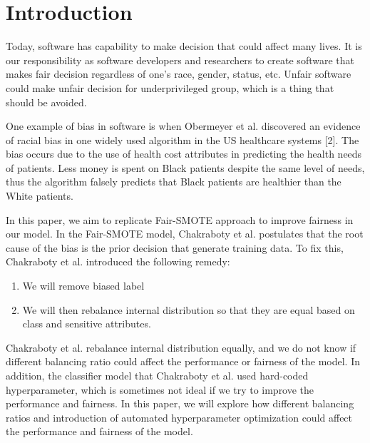 \documentclass[sigconf]{acmart}
\begin{document}

\maketitle

\section{Introduction}
Today, software has capability to make decision that could affect many lives. It is our responsibility as software developers and researchers to create software that makes fair decision regardless of one's race, gender, status, etc. Unfair software could make unfair decision for underprivileged group, which is a thing that should be avoided. 

One example of bias in software is when Obermeyer et al. discovered an evidence of racial bias in one widely used algorithm in the US healthcare systems [2]. The bias occurs due to the use of health cost attributes in predicting the health needs of patients. Less money is spent on Black patients despite the same level of needs, thus the algorithm falsely predicts that Black patients are healthier than the White patients.   

In this paper, we aim to replicate Fair-SMOTE approach to improve fairness in our model. In the Fair-SMOTE model, Chakraboty et al. postulates that the root cause of the bias is the prior decision that generate training data. To fix this, Chakraboty et al. introduced the following remedy:
\begin{enumerate}
    \item We will remove biased label
    \item We will then rebalance internal distribution so that they are equal based on class and sensitive attributes.
\end{enumerate}
Chakraboty et al. rebalance internal distribution equally, and we do not know if different balancing ratio could affect the performance or fairness of the model. In addition, the classifier model that Chakraboty et al. used hard-coded hyperparameter, which is sometimes not ideal if we try to improve the performance and fairness. In this paper, we will explore how different balancing ratios and introduction of automated hyperparameter optimization could affect the performance and fairness of the model. 
\end{document}
